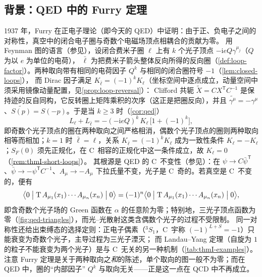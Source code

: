 \documentclass[UTF8,a4paper,11pt,fontset=fandol]{ctexart}
\theoremstyle{cplain}
\theoremstyle{cdefinition}
\theoremstyle{cremark}
\numberwithin{equation}{section}
\newcommand{\tp}{\mathsf{T}}                         %
\newcommand{\SF}{S_{F}}                              %
\newcommand{\ii}{\mathrm{i}}                        %
\newcommand{\Cconj}[1]{\widetilde{#1}}              %
\begin{document}
\subsection{背景：QED 中的 Furry 定理}\label{sec:intro-qed}

1937 年，Furry 在正电子理论（即今天的 QED）中证明\cite{Furry1937}：由于正、负电子之间的对称性，真空中的闭合电子圈与奇数个电磁场顶点相耦合的贡献为零。
用 Feynman 图的语言（参见\cite[第~10.1~节]{PeskinSchroeder1995}），设闭合费米子圈 $\ell$ 上有 $k$ 个光子顶点 $-\ii eQ\gamma^{\mu_j}$（$Q$ 为以 $e$ 为单位的电荷），
$\bar\ell$ 为把费米子箭头整体反向所得的反向圈（\cref{def:loop-factor}）。两种取向带有相同的电荷因子 $Q^k$ 与相同的闭合圈符号 $-1$（\cref{lem:closed-loops}），
而 Dirac 因子满足 $K_{\bar\ell}=(-1)^kK_\ell$（坐标空间中逐点成立，动量空间中须采用镜像动量配置，见\cref{prop:loop-reversal}）：
Clifford 共轭 $\Cconj X=CX^{\tp}C^{-1}$ 是保持迹的反自同构，它反转圈上矩阵乘积的次序（这正是把圈反向），并且 $\Cconj{\gamma^\mu}=-\gamma^\mu$、$\Cconj{S(p)}=S(-p)$。于是当 $k\ge3$ 时（\cref{cor:qed}）
\begin{equation}\label{eq:intro-qed}
L_\ell+L_{\bar\ell}=-(-\ii eQ)^k\,K_\ell\,\bigl[1+(-1)^k\bigr],
\end{equation}
即奇数个光子顶点的圈在两种取向之间严格相消，偶数个光子顶点的圈则两种取向相等而相加；$k=1$ 时 $\bar\ell=\ell$，关系 $K_{\bar\ell}=(-1)^kK_\ell$ 成为一致性条件 $K_\ell=-K_\ell$；$\SF(0)$ 须先正规化，在 C~相容的正规化中这一条件成立，故 $K_\ell=0$（\cref{rem:thmI-short-loops}）。
其根源是 QED 的 C~不变性（参见\cite{ItzyksonZuber1980,WeinbergQTF1}）：在 $\psi\to C\bar\psi^{\tp}$、$\bar\psi\to-\psi^{\tp}C^{-1}$、$A_\mu\to-A_\mu$ 下拉氏量不变，光子是 C~奇的。若真空是 C~不变的，便有
\begin{equation}\label{eq:intro-qed-green}
\bigl\langle0\bigm|\mathrm T\,A_{\mu_1}(x_1)\cdots A_{\mu_n}(x_n)\bigm|0\bigr\rangle
=(-1)^n\bigl\langle0\bigm|\mathrm T\,A_{\mu_1}(x_1)\cdots A_{\mu_n}(x_n)\bigm|0\bigr\rangle ,
\end{equation}
即含奇数个光子场的 Green 函数在 $\alpha$ 的任意阶为零；特别地，三光子顶点函数为零（\cref{fig:qed-triangles}），而光--光散射这类含偶数个光子的过程不受限制。
同一对称性还给出束缚态的选择定则：正电子偶素（${}^3S_1$，C~宇称 $(-1)^{L+S}=-1$）只能衰变为奇数个光子，主导过程为三光子湮灭\cite{OrePowell1949}；
而 Landau--Yang 定理（自旋为 $1$ 的粒子不能衰变为两个光子\cite{Landau1948,Yang1950}）是与 C~无关的另一种机制（\cref{tab:thmI-examples}）。
注意 Furry 定理是关于两种取向之\emph{和}的陈述，单个取向的图一般不为零；而在 QED 中，圈的“内部因子” $Q^k$ 与取向无关——正是这一点在 QCD 中不再成立。
\end{document}
